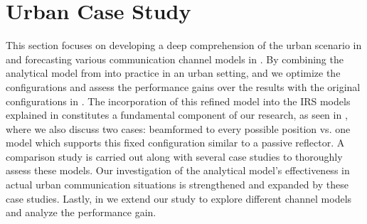 \section{Urban Case Study}\label{Urban Case Study}
This section focuses on developing a deep comprehension of the urban scenario in  and forecasting various communication channel models in . By combining  the analytical model from  into practice in an urban setting,  and  we optimize the configurations and assess the performance gains over the results with the original configurations in . The incorporation of this refined model into the IRS models explained in  constitutes a fundamental component of our research, as seen in , where we also discuss two cases: beamformed to every possible position vs. one model which supports this fixed configuration similar to a passive reflector. A comparison study is carried out along with several case studies to thoroughly assess these models. Our investigation of the analytical model's effectiveness in actual urban communication situations is strengthened and expanded by these case studies. Lastly, in  we extend our study to explore different channel models and analyze the performance gain.
